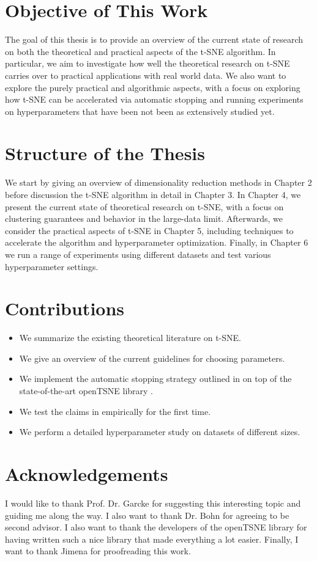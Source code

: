 \section*{Objective of This Work}
The goal of this thesis is to provide an overview of the current state of research on both the theoretical and practical aspects of the t-SNE algorithm.  
In particular, we aim to investigate how well the theoretical research on t-SNE carries over to practical applications with real world data. 
We also want to explore the purely practical and algorithmic aspects, with a focus on exploring how t-SNE can be accelerated via automatic stopping \cite{belkina19} and running experiments on hyperparameters that have been not been as extensively studied yet. 
 

\section*{Structure of the Thesis}
We start by giving an overview of dimensionality reduction methods in Chapter 2 before discussion the t-SNE algorithm in detail in Chapter 3. 
In Chapter 4, we present the current state of theoretical research on t-SNE, with a focus on clustering guarantees and behavior in the large-data limit. 
Afterwards, we consider the practical aspects of t-SNE in Chapter 5, including techniques to accelerate the algorithm and hyperparameter optimization. 
Finally, in Chapter 6 we run a range of experiments using different datasets and test various hyperparameter settings. 

\section*{Contributions}
\begin{itemize}
    \item We summarize the existing theoretical literature on t-SNE. 
    \item We give an overview of the current guidelines for choosing parameters. 
    \item We implement the automatic stopping strategy outlined in \cite{belkina19} on top of the state-of-the-art openTSNE library \cite{openTSNE}. 
    \item We test the claims in \cite{murray2024largedatalimitsscaling} empirically for the first time. 
    \item We perform a detailed hyperparameter study on datasets of different sizes. 
\end{itemize}

\section*{Acknowledgements}
I would like to thank Prof. Dr. Garcke for suggesting this interesting topic and guiding me along the way. 
I also want to thank Dr. Bohn for agreeing to be second advisor. I also want to thank the developers of the openTSNE library for having written such a nice library that made everything a lot easier. 
Finally, I want to thank Jimena for proofreading this work. 



